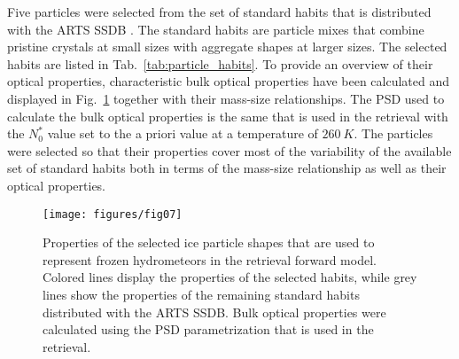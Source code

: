\documentclass[journal abbreviation, manuscript]{copernicus}
\begin{document}
Five particles were selected from the set of standard habits that is distributed
with the ARTS SSDB \citep{eriksson18}. The standard habits are particle mixes
that combine pristine crystals at small sizes with aggregate shapes at larger
sizes. The selected habits are listed in Tab.~\ref{tab:particle_habits}. To
provide an overview of their optical properties, characteristic bulk optical
properties have been calculated and displayed in Fig.~\ref{fig:particle_properties}
together with their mass-size relationships. The PSD used to calculate the bulk
optical properties is the same that is used in the retrieval with the $N_0^*$
value set to the a priori value at a temperature of $260\ \unit{K}$. The
particles were selected so that their properties cover most of the variability
of the available set of standard habits both in terms of the mass-size
relationship as well as their optical properties.

\begin{figure}[hbpt!]
  \centering
  \texttt{[image: figures/fig07]}
  \caption{Properties of the selected ice particle shapes that are used to
    represent frozen hydrometeors in the retrieval forward model. Colored lines
    display the properties of the selected habits, while grey lines show the
    properties of the remaining standard habits distributed with the ARTS SSDB.
    Bulk optical properties were calculated using the PSD parametrization that
    is used in the retrieval. }
  \label{fig:particle_properties}
\end{figure}
\end{document}

